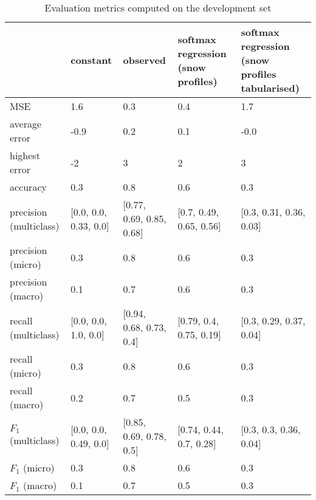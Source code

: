 \begin{table}[H]
\caption{Evaluation metrics computed on the development set}
\label{tbl:sais_eval_development}
\begin{tabular}{lllll}
\toprule
 & constant & observed & softmax regression (snow profiles) & softmax regression (snow profiles tabularised) \\
\midrule
MSE & 1.6 & 0.3 & 0.4 & 1.7 \\
average error & -0.9 & 0.2 & 0.1 & -0.0 \\
highest error & -2 & 3 & 2 & 3 \\
accuracy & 0.3 & 0.8 & 0.6 & 0.3 \\
precision (multiclass) & [0.0, 0.0, 0.33, 0.0] & [0.77, 0.69, 0.85, 0.68] & [0.7, 0.49, 0.65, 0.56] & [0.3, 0.31, 0.36, 0.03] \\
precision (micro) & 0.3 & 0.8 & 0.6 & 0.3 \\
precision (macro) & 0.1 & 0.7 & 0.6 & 0.3 \\
recall (multiclass) & [0.0, 0.0, 1.0, 0.0] & [0.94, 0.68, 0.73, 0.4] & [0.79, 0.4, 0.75, 0.19] & [0.3, 0.29, 0.37, 0.04] \\
recall (micro) & 0.3 & 0.8 & 0.6 & 0.3 \\
recall (macro) & 0.2 & 0.7 & 0.5 & 0.3 \\
$F_1$ (multiclass) & [0.0, 0.0, 0.49, 0.0] & [0.85, 0.69, 0.78, 0.5] & [0.74, 0.44, 0.7, 0.28] & [0.3, 0.3, 0.36, 0.04] \\
$F_1$ (micro) & 0.3 & 0.8 & 0.6 & 0.3 \\
$F_1$ (macro) & 0.1 & 0.7 & 0.5 & 0.3 \\
\bottomrule
\end{tabular}
\end{table}
